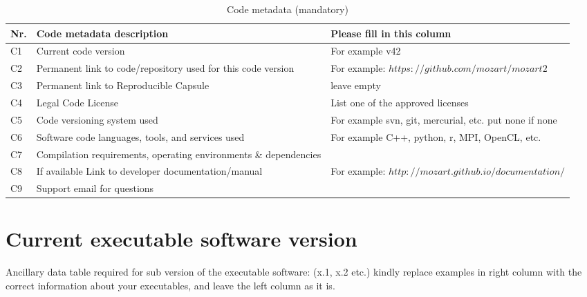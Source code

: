 \documentclass[preprint,12pt, a4paper]{elsarticle}
\begin{document}
\begin{table}[!h]
\begin{tabular}{|l|p{6.5cm}|p{6.5cm}|}
\hline
\textbf{Nr.} & \textbf{Code metadata description} & \textbf{Please fill in this column} \\
\hline
C1 & Current code version & For example v42 \\
\hline
C2 & Permanent link to code/repository used for this code version & For example: $https://github.com/mozart/mozart2$ \\
\hline
C3  & Permanent link to Reproducible Capsule & leave empty \\
\hline
C4 & Legal Code License   & List one of the approved licenses \\
\hline
C5 & Code versioning system used & For example svn, git, mercurial, etc. put none if none \\
\hline
C6 & Software code languages, tools, and services used & For example C++, python, r, MPI, OpenCL, etc. \\
\hline
C7 & Compilation requirements, operating environments \& dependencies & \\
\hline
C8 & If available Link to developer documentation/manual & For example: $http://mozart.github.io/documentation/$ \\
\hline
C9 & Support email for questions & \\
\hline
\end{tabular}
\caption{Code metadata (mandatory)}
\label{} 
\end{table}

\section*{Current executable software version}
\label{}

Ancillary data table required for sub version of the executable software: (x.1, x.2 etc.) kindly replace examples in right column with the correct information about your executables, and leave the left column as it is.
\end{document}
